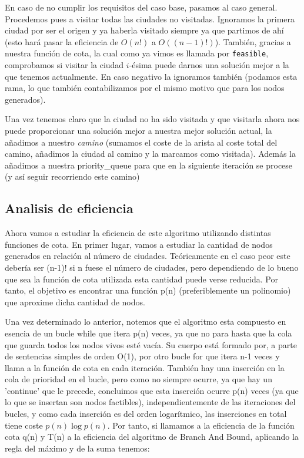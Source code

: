 \documentclass{article}
\begin{document}


En caso de no cumplir los requisitos del caso base, pasamos al caso general.
Procedemos pues a visitar todas las ciudades no visitadas.
Ignoramos la primera ciudad por ser el origen y ya haberla visitado siempre ya que partimos de ahí (esto hará pasar la eficiencia de $O(n!)$ a $O((n-1)!)$).
También, gracias a nuestra función de cota, la cual como ya vimos es llamada por \verb|feasible|, comprobamos si visitar la ciudad $i$-ésima puede darnos una solución mejor a la que tenemos actualmente. En caso negativo la ignoramos también (podamos esta rama, lo que también contabilizamos por el mismo motivo que para los nodos generados).





Una vez tenemos claro que la ciudad no ha sido visitada y que visitarla ahora nos puede proporcionar una solución mejor a nuestra mejor solución actual, la añadimos a nuestro \textit{camino} (sumamos el coste de la arista al coste total del camino, añadimos la ciudad al camino y la marcamos como visitada). 
Además la añadimos a nuestra priority\_queue para que en la siguiente iteración se procese (y así seguir recorriendo este camino)


\subsection{Analisis de eficiencia}

Ahora vamos a estudiar la eficiencia de este algoritmo utilizando distintas funciones de cota. En primer lugar, vamos a estudiar la cantidad de nodos 
generados en relación al número de ciudades. Teóricamente en el caso peor este debería ser (n-1)! si n fuese el número de ciudades, pero dependiendo de lo bueno que sea la función de cota utilizada esta cantidad puede verse reducida. Por tanto, el objetivo es encontrar una función p(n) (preferiblemente un polinomio) que aproxime dicha cantidad de nodos. 

Una vez determinado lo anterior, notemos que el algoritmo esta compuesto en esencia de un bucle while que itera p(n) veces, ya que no para hasta que la cola que guarda todos los nodos vivos esté vacía. Su cuerpo está formado por, a parte de sentencias simples de orden O(1), por otro bucle for que itera n-1 veces y llama a la función de cota en cada iteración. También hay una inserción en la cola de prioridad en el bucle, pero como no siempre ocurre, ya que hay un 'continue' que le precede, concluimos que esta inserción ocurre p(n) veces (ya que lo que se insertan son nodos factibles), independientemente de las iteraciones del bucles, y como cada inserción es del orden logarítmico, las inserciones en total tiene coste $p(n)\log{p(n)}$. Por tanto, si llamamos a la eficiencia de la función cota q(n) y T(n) a la eficiencia del algoritmo de Branch And Bound, aplicando la regla del máximo y de la suma tenemos: 
\end{document}
